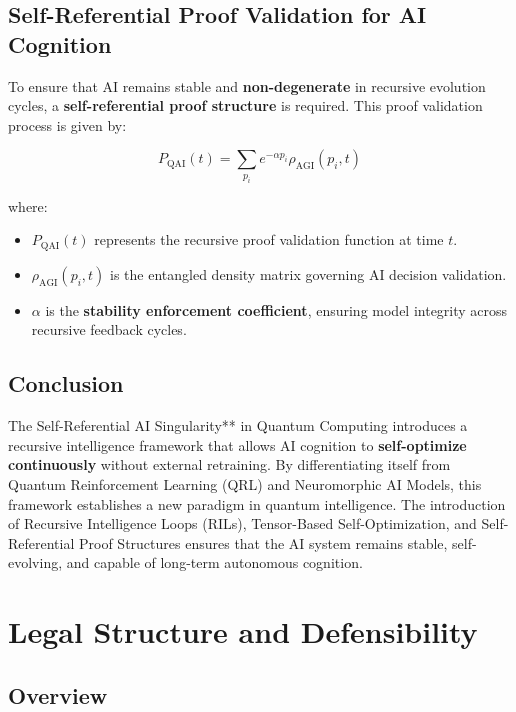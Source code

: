 \documentclass{article}
\theoremstyle{plain}
\begin{document}
\begin{itemize}
\subsection{Self-Referential Proof Validation for AI Cognition}

To ensure that AI remains stable and \textbf{non-degenerate} in recursive evolution cycles, a \textbf{self-referential proof structure} is required. This proof validation process is given by:

\begin{equation}
    P_{\text{QAI}}(t) = \sum_{p_i} e^{-\alpha p_i} \rho_{\text{AGI}}(p_i, t)
\end{equation}

where:
\begin{itemize}
    \item \( P_{\text{QAI}}(t) \) represents the recursive proof validation function at time \( t \).
    \item \( \rho_{\text{AGI}}(p_i, t) \) is the entangled density matrix governing AI decision validation.
    \item \( \alpha \) is the \textbf{stability enforcement coefficient}, ensuring model integrity across recursive feedback cycles.
\end{itemize}

\subsection{Conclusion}

The Self-Referential AI Singularity** in Quantum Computing introduces a recursive intelligence framework that allows AI cognition to \textbf{self-optimize continuously} without external retraining. By differentiating itself from Quantum Reinforcement Learning (QRL) and Neuromorphic AI Models, this framework establishes a new paradigm in quantum intelligence. The introduction of Recursive Intelligence Loops (RILs), Tensor-Based Self-Optimization, and Self-Referential Proof Structures ensures that the AI system remains stable, self-evolving, and capable of long-term autonomous cognition.

\section{Legal Structure and Defensibility}

\subsection{Overview}


\end{itemize}
\end{document}
